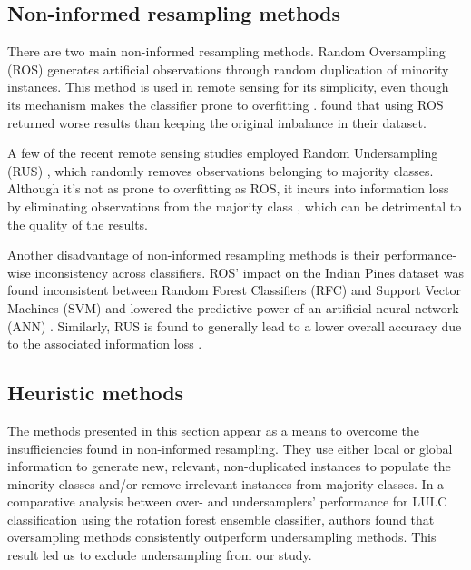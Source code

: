 \documentclass[parskip=full]{scrartcl}
\begin{document}
\subsection{Non-informed resampling methods}

There are two main non-informed resampling methods. Random Oversampling (ROS)
generates artificial observations through random duplication of minority
instances.  This method is used in remote sensing \cite{Sharififar2019,
Hounkpatin2018} for its simplicity, even though its mechanism makes the
classifier prone to overfitting \cite{Krawczyk2016}. 
\cite{Hounkpatin2018} found that using ROS returned worse results than keeping
the original imbalance in their dataset.

A few of the recent remote sensing studies employed Random Undersampling (RUS)
\cite{Ferreira2019}, which randomly removes
observations belonging to majority classes. Although it's not as prone to
overfitting as ROS, it incurs into information loss by eliminating observations
from the majority class \cite{Feng2019}, which can be detrimental to the
quality of the results.

Another disadvantage of non-informed resampling methods is their performance-wise
inconsistency across classifiers. ROS' impact on the Indian Pines dataset was
found inconsistent between Random Forest Classifiers (RFC) and Support Vector
Machines (SVM) and lowered the predictive power of an artificial neural network
(ANN) \cite{Maxwell2018}. Similarly, RUS is found to generally lead to a lower
overall accuracy due to the associated information loss \cite{Maxwell2018}.

\subsection{Heuristic methods}

The methods presented in this section appear as a means to overcome the
insufficiencies found in non-informed resampling. They use either local or
global information to generate new, relevant, non-duplicated instances to
populate the minority classes and/or remove irrelevant instances from majority
classes. In a comparative analysis between over- and undersamplers' performance
for LULC classification \cite{Feng2018} using the rotation forest ensemble
classifier, authors found that oversampling methods consistently outperform
undersampling methods. This result led us to exclude undersampling from our
study.
\end{document}
